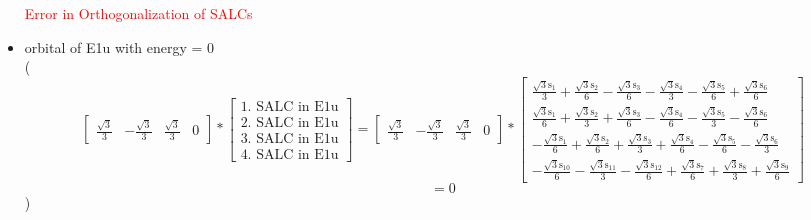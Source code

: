 \documentclass[12pt,a4paper]{article}
\begin{document}
\begin{itemize}
\textcolor{red}{Error in Orthogonalization of SALCs}\item orbital of E1u with energy = 
                                $0$ \\
( 
$$
\left[\begin{matrix}\frac{\sqrt{3}}{3} & - \frac{\sqrt{3}}{3} & \frac{\sqrt{3}}{3} & 0\end{matrix}\right] * \left[\begin{array}{c}\text{1. SALC in E1u} \\ \text{2. SALC in E1u} \\ \text{3. SALC in E1u} \\ \text{4. SALC in E1u}\end{array}\right] = \left[\begin{matrix}\frac{\sqrt{3}}{3} & - \frac{\sqrt{3}}{3} & \frac{\sqrt{3}}{3} & 0\end{matrix}\right] * \left[\begin{matrix}\frac{\sqrt{3} \text{s}_{1}}{3} + \frac{\sqrt{3} \text{s}_{2}}{6} - \frac{\sqrt{3} \text{s}_{3}}{6} - \frac{\sqrt{3} \text{s}_{4}}{3} - \frac{\sqrt{3} \text{s}_{5}}{6} + \frac{\sqrt{3} \text{s}_{6}}{6}\\\frac{\sqrt{3} \text{s}_{1}}{6} + \frac{\sqrt{3} \text{s}_{2}}{3} + \frac{\sqrt{3} \text{s}_{3}}{6} - \frac{\sqrt{3} \text{s}_{4}}{6} - \frac{\sqrt{3} \text{s}_{5}}{3} - \frac{\sqrt{3} \text{s}_{6}}{6}\\- \frac{\sqrt{3} \text{s}_{1}}{6} + \frac{\sqrt{3} \text{s}_{2}}{6} + \frac{\sqrt{3} \text{s}_{3}}{3} + \frac{\sqrt{3} \text{s}_{4}}{6} - \frac{\sqrt{3} \text{s}_{5}}{6} - \frac{\sqrt{3} \text{s}_{6}}{3}\\- \frac{\sqrt{3} \text{s}_{10}}{6} - \frac{\sqrt{3} \text{s}_{11}}{3} - \frac{\sqrt{3} \text{s}_{12}}{6} + \frac{\sqrt{3} \text{s}_{7}}{6} + \frac{\sqrt{3} \text{s}_{8}}{3} + \frac{\sqrt{3} \text{s}_{9}}{6}\end{matrix}\right] 
 $$ $$ = 0 
 $$ 
 )


\end{itemize}
\end{document}
